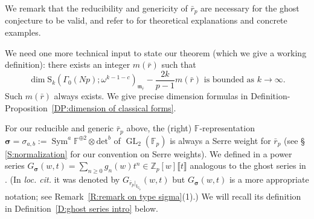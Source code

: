 \documentclass[12pt]{amsart}
\theoremstyle{definition}
\numberwithin{equation}{subsection}
\def\gothm{\mathfrak{m}}
\def\FF{\mathbb{F}}
\def\QQ{\mathbb{Q}}
\def\ZZ{\mathbb{Z}}
\def\rmI{\mathrm{I}}
\def\rmS{\mathrm{S}}
\DeclareMathOperator{\GL}{GL}
\DeclareMathOperator{\Sym}{Sym}
\newcommand{\bbsigma}{\boldsymbol{\sigma}}
\renewcommand{\det}{\mathrm{det}}
\begin{document}
We remark that the reducibility and genericity of $\bar r_p$ are necessary for the ghost conjecture to be valid, and refer to \cite{bergdall-pollack4} for theoretical explanations and concrete examples.


We need one more technical input to state our theorem (which we give a working definition): there exists an integer $m(\bar r)$ such that
$$ \dim\rmS_k(\Gamma_0(Np); \omega^{k-1-c})_{\gothm_{\bar r}} - \frac{2k}{p-1} m(\bar r) \textrm{ is bounded as }k \to \infty.
$$
Such $m(\bar r)$ always exists. We give precise dimension formulas in Definition-Proposition~\ref{DP:dimension of classical forms}.

For our reducible and generic $\bar r_p$ above, the (right) $\FF$-representation $\bbsigma= \sigma_{a,b} := \Sym^a \FF^{\oplus 2} \otimes \det^b$ of $\GL_2(\FF_p)$ is always a Serre weight for $\bar r_p$ (see \S\,\ref{S:normalization} for our convention on Serre weights).  We defined in \cite{liu-truong-xiao-zhao} a power series $G_{\bbsigma}(w,t)  = \sum\limits_{n \geq 0} g_n(w) t^n \in \ZZ_p[w]\llbracket t \rrbracket$  analogous to the ghost series in \cite{bergdall-pollack2}. (In \emph{loc. cit.} it was denoted by $G_{\bar r_p|_{\rmI_{\QQ_p}}}(w,t)$ but $G_{\bbsigma}(w,t)$ is a more appropriate notation; see Remark~\ref{R:remark on type sigma}(1).)  We will recall its definition in Definition~\ref{D:ghost series intro} below.
\end{document}
